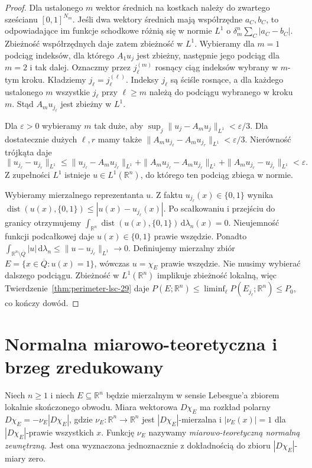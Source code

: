 \begin{proof}
Dla ustalonego $m$ wektor średnich na kostkach
należy do zwartego sześcianu $[0,1]^{N_m}$.
Jeśli dwa wektory średnich mają współrzędne
$a_C,b_C$, to odpowiadające im funkcje schodkowe
różnią się w normie $L^1$ o
$\delta_m^n\sum_C|a_C-b_C|$. Zbieżność współrzędnych
daje zatem zbieżność w $L^1$.
Wybieramy dla $m=1$ podciąg indeksów, dla którego
$A_1u_j$ jest zbieżny, następnie jego podciąg dla
$m=2$ i tak dalej. Oznaczmy przez $j^{(m)}_\ell$
rosnący ciąg indeksów wybrany w $m$-tym kroku.
Kładziemy $j_\ell=j^{(\ell)}_\ell$. Indeksy
$j_\ell$ są ściśle rosnące, a dla każdego
ustalonego $m$ wszystkie $j_\ell$ przy $\ell\ge m$
należą do podciągu wybranego w kroku $m$.
Stąd $A_m u_{j_\ell}$ jest zbieżny w $L^1$.

Dla $\varepsilon>0$ wybieramy $m$ tak duże, aby
$\sup_j\|u_j-A_mu_j\|_{L^1}<\varepsilon/3$.
Dla dostatecznie dużych $\ell,r$ mamy także
$\|A_mu_{j_\ell}-A_mu_{j_r}\|_{L^1}<\varepsilon/3$.
Nierówność trójkąta daje
\[
 \|u_{j_\ell}-u_{j_r}\|_{L^1}
 \le\|u_{j_\ell}-A_mu_{j_\ell}\|_{L^1}
 +\|A_mu_{j_\ell}-A_mu_{j_r}\|_{L^1}
 +\|A_mu_{j_r}-u_{j_r}\|_{L^1}<\varepsilon.
\]
Z zupełności $L^1$ istnieje $u\in L^1(\mathbb R^n)$,
do którego ten podciąg zbiega w normie.

Wybieramy mierzalnego reprezentanta $u$.
Z faktu $u_{j_\ell}(x)\in\{0,1\}$ wynika
$\operatorname{dist}(u(x),\{0,1\})
\le|u(x)-u_{j_\ell}(x)|$.
Po scałkowaniu i przejściu do granicy otrzymujemy
$\int_{\mathbb R^n}\operatorname{dist}(u(x),\{0,1\})
\,\mathrm d\lambda_n(x)=0$.
Nieujemność funkcji podcałkowej daje
$u(x)\in\{0,1\}$ prawie wszędzie.
Ponadto
$\int_{\mathbb R^n\setminus\overline Q}|u|
\,\mathrm d\lambda_n\le\|u-u_{j_\ell}\|_{L^1}\to0$.
Definiujemy mierzalny zbiór
$E=\{x\in\overline Q:u(x)=1\}$, wówczas
$u=\chi_E$ prawie wszędzie. Nie musimy wybierać
dalszego podciągu. Zbieżność w $L^1(\mathbb R^n)$
implikuje zbieżność lokalną, więc
Twierdzenie~\ref{thm:perimeter-lsc-29} daje
$P(E;\mathbb R^n)\le\liminf_\ell P(E_{j_\ell};\mathbb R^n)
\le P_0$, co kończy dowód.
\end{proof}

\section{Normalna miarowo-teoretyczna i brzeg zredukowany}
\begin{definicja}
\label{def:normal-BV-29}
Niech $n\ge1$ i niech $E\subseteq\mathbb R^n$
będzie mierzalnym w sensie Lebesgue'a zbiorem
lokalnie skończonego obwodu.
Miara wektorowa $D\chi_E$ ma rozkład polarny
$D\chi_E=-\nu_E|D\chi_E|$, gdzie
$\nu_E:\mathbb R^n\to\mathbb R^n$ jest
$|D\chi_E|$-mierzalna i
$|\nu_E(x)|=1$ dla $|D\chi_E|$-prawie wszystkich $x$.
Funkcję $\nu_E$ nazywamy \emph{miarowo-teoretyczną
normalną zewnętrzną}. Jest ona wyznaczona jednoznacznie
z dokładnością do zbioru $|D\chi_E|$-miary zero.
\end{definicja}

